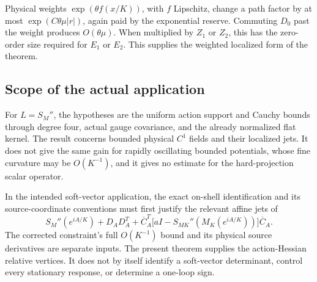 Physical weights \(\exp(\theta f(x/K))\), with \(f\) Lipschitz,
change a path factor by at most
\(\exp(C\theta\mu|r|)\), again paid by the exponential reserve.
Commuting \(D_0\) past the weight produces \(O(\theta\mu)\).
When multiplied by \(Z_1\) or \(Z_2\), this has the zero-order
size required for \(E_1\) or \(E_2\).  This supplies the weighted
localized form of the theorem.

\subsection{Scope of the actual application}
\label{chr-scope}

For \(L=S_M''\), the hypotheses are the uniform action support and
Cauchy bounds through degree four, actual gauge covariance, and
the already normalized flat kernel.  The result concerns bounded
physical \(C^1\) fields and their localized jets.  It does not give
the same gain for rapidly oscillating bounded potentials, whose
fine curvature may be \(O(K^{-1})\), and it gives no estimate for
the hard-projection scalar operator.

In the intended soft-vector application, the exact on-shell
identification and its source-coordinate conventions must first
justify the relevant affine jets of
\[
 S_M''(e^{iA/K})+D_AD_A^T+
 \overline C_A^T
 \bigl[aI-S_{MK}''(M_K(e^{iA/K}))\bigr]\overline C_A .
\]
The corrected constraint's full \(O(K^{-1})\) bound and its
physical source derivatives are separate inputs.  The present
theorem supplies the action-Hessian relative vertices.  It does
not by itself identify a soft-vector determinant, control every
stationary response, or determine a one-loop sign.


